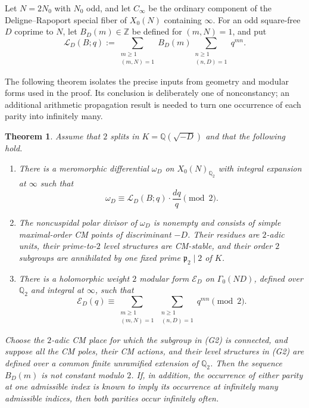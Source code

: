 \documentclass[11pt]{amsart}
\newtheorem{theorem}{Theorem}
\theoremstyle{remark}
\numberwithin{equation}{section}
\newcommand{\Q}{\mathbb Q}
\newcommand{\Z}{\mathbb Z}
\begin{document}
Let $N=2N_0$ with $N_0$ odd, and let $C_\infty$ be the ordinary component of
the Deligne--Rapoport special fiber of $X_0(N)$ containing $\infty$.  For an
odd square-free $D$ coprime to $N$, let $B_D(m)\in\Z$ be defined for
$(m,N)=1$, and put
\[
 \mathcal L_D(B;q):=
 \sum_{\substack{m\geq1\\(m,N)=1}}B_D(m)
 \sum_{\substack{n\geq1\\(n,D)=1}}q^{mn}.
\]

The following theorem isolates the precise inputs from geometry and modular
forms used in the proof.  Its conclusion is deliberately one of
nonconstancy; an additional arithmetic propagation result is needed to turn
one occurrence of each parity into infinitely many.

\begin{theorem}\label{thm:general}
 Assume that $2$ splits in $K=\Q(\sqrt{-D})$ and that the following hold.
 \begin{enumerate}
 \item[(G1)] There is a meromorphic differential $\omega_D$ on
 $X_0(N)_{\Q_2}$ with integral expansion at $\infty$ such that
 \[
   \omega_D\equiv \mathcal L_D(B;q)\cdot \frac{dq}{q}\pmod2.
 \]
 \item[(G2)] The noncuspidal polar divisor of $\omega_D$ is nonempty and
 consists of simple maximal-order CM points of discriminant $-D$.  Their
 residues are $2$-adic units, their prime-to-$2$ level structures are
 CM-stable, and their order $2$ subgroups are annihilated by one fixed prime
 $\mathfrak p_2\mid2$ of $K$.
 \item[(G3)] There is a holomorphic weight $2$ modular form
 $\mathcal E_D$ on $\Gamma_0(ND)$, defined over $\Q_2$ and integral at
 $\infty$, such that
 \[
  \mathcal E_D(q)\equiv
  \sum_{\substack{m\geq1\\(m,N)=1}}
  \sum_{\substack{n\geq1\\(n,D)=1}}q^{mn}\pmod2.
 \]
 \end{enumerate}
 Choose the $2$-adic CM place for which the subgroup in \emph{(G2)} is
 connected, and suppose all the CM poles, their CM actions, and their level
 structures in \emph{(G2)} are defined over a common finite unramified
 extension of $\Q_2$.  Then the sequence $B_D(m)$
 is not constant modulo $2$.
 If, in addition, the occurrence of either parity at one admissible index is
 known to imply its occurrence at infinitely many admissible indices, then
 both parities occur infinitely often.
\end{theorem}
\end{document}
